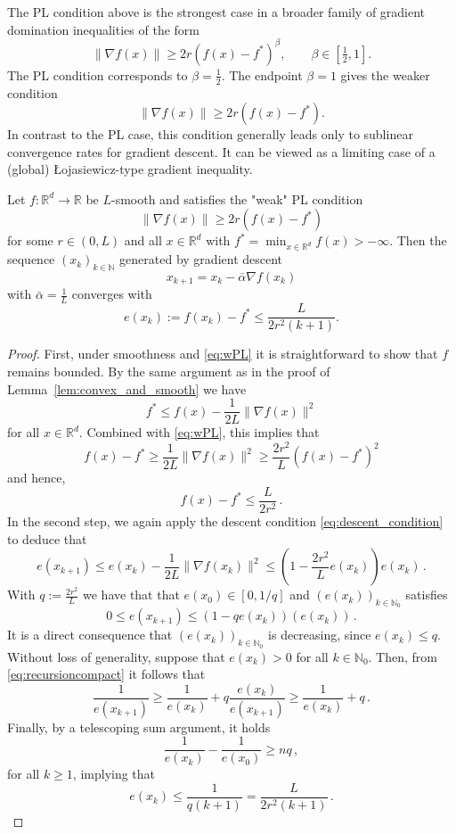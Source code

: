 \documentclass[12pt,openany]{book}
\theoremstyle{definition}
\theoremstyle{definition}
\newcommand{\N}{\mathbb{N}}
\newcommand{\R}{\mathbb{R}}
\begin{document}
The PL condition above is the strongest case in a broader family of gradient domination inequalities of the form
\[
\|\nabla f(x)\|\geq 2r(f(x)-f^\ast)^\beta,
\qquad \beta\in[\tfrac12,1].
\]
The PL condition corresponds to $\beta=\frac12$. The endpoint $\beta=1$ gives the weaker
condition
\[
\|\nabla f(x)\|\geq 2r(f(x)-f^\ast).
\]
In contrast to the PL case, this condition generally leads only to sublinear convergence rates for
gradient descent. It can be viewed as a limiting case of a (global) {\L}ojasiewicz-type gradient inequality.
\begin{thm}\label{thm:GDwPL}
Let $f:\R^d\to\R$ be $L$-smooth and satisfies the "weak" PL condition 
\begin{equation}\label{eq:wPL}
\|\nabla f(x)\| \ge 2r (f(x)-f^\ast)
\end{equation}
for some $r\in(0,L)$ and all $x\in\R^d$ with $f^\ast = \min_{x\in\R^d} f(x)>-\infty$. Then the sequence $(x_k)_{k\in\N}$ generated by gradient descent
\[x_{k+1} = x_k - \bar\alpha \nabla f(x_k) \]
with $\bar\alpha = \frac1L$ converges with
\[ e(x_k):= f(x_k)-f^\ast\le \frac{L}{2r^2(k+1)}.\]
\end{thm}
\begin{proof}
    First, under smoothness and \eqref{eq:wPL} it is straightforward to show that $f$ remains bounded. By the same argument as in the proof of Lemma~\ref{lem:convex_and_smooth} we have 
    \[ f^\ast \le f(x) -\frac1{2L} \|\nabla f(x)\|^2\]
    for all $x\in\R^d$. Combined with \eqref{eq:wPL}, this implies that
    \[f(x)-f^\ast \ge \frac{1}{2L}\|\nabla f(x)\|^2 \ge \frac{2r^2}{L} (f(x)-f^\ast)^2 \]
    and hence,
    \[f(x)-f^\ast\le \frac{L}{2r^2}\,.\]
    In the second step, we again apply the descent condition \eqref{eq:descent_condition} to deduce that
    \[ e(x_{k+1}) \le e(x_k) - \frac{1}{2L} \|\nabla f(x_k)\|^2 \le (1-\frac{2r^2}{L}e(x_k))e(x_k)\,.\]
    With $q:=\frac{2r^2}{L}$ we have that that $e(x_0)\in[0,1/q]$ and $(e(x_k))_{k\in\N_0}$ satisfies 
    \begin{equation}\label{eq:recursioncompact} 0\le e(x_{k+1}) \le (1-qe(x_k))(e(x_k))\,.
    \end{equation}
    It is a direct consequence that $(e(x_{k}))_{k\in\N_0}$ is decreasing, since $e(x_k)\le q$. Without loss of generality, suppose that $e(x_{k})>0$ for all $k\in\N_0$. Then, from \eqref{eq:recursioncompact} it follows that
    \[\frac{1}{e(x_{k+1})} \ge \frac{1}{e(x_k)} + q \frac{e(x_k)}{e(x_{k+1})} \ge \frac{1}{e(x_k)} + q\,.\]
    Finally, by a telescoping sum argument, it holds
    \[ \frac{1}{e(x_k)} - \frac{1}{e(x_0)} \ge nq\,, \]
    for all $k\ge1$, implying that
    \[ e(x_k) \le \frac{1}{q(k+1)} = \frac{L}{2r^2(k+1)}\,.\]
\end{proof}
\end{document}
